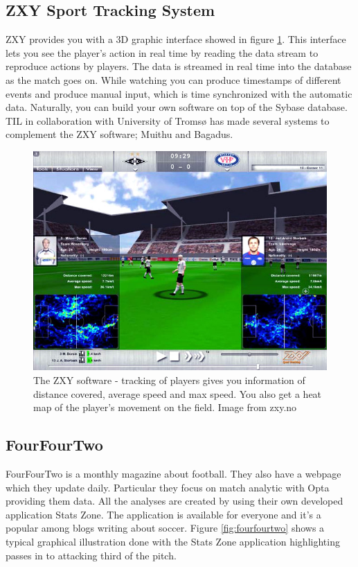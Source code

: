 \subsection{ZXY Sport Tracking System}
ZXY provides you with a 3D graphic interface showed in figure \ref{fig:zxysoftware}. This interface lets you see the player’s action in real time by reading the data stream to reproduce actions by players. The data is streamed in real time into the database as the match goes on. While watching you can produce timestamps of different events and produce manual input, which is time synchronized with the automatic data. Naturally, you can build your own software on top of the Sybase database. \ac{TIL} in collaboration with University of Troms{\o} has made several systems to complement the ZXY software; Muithu\cite{muithu} and Bagadus\cite{Saegrov2012}.

\begin{figure}[ht!]
\centering
\includegraphics[width=1\textwidth]{images/general/zxysoftware.png}
\caption{The ZXY software - tracking of players gives you information of distance covered, average speed and max speed. You also get a heat map of the player’s movement on the field. Image from zxy.no}
\label{fig:zxysoftware}
\end{figure}


\subsection{FourFourTwo}

FourFourTwo is a monthly magazine about football. They also have a webpage which they update daily. Particular they focus on match analytic with Opta providing them data. All the analyses are created by using their own developed application Stats Zone. The application is available for everyone and it’s a popular among blogs writing about soccer. Figure \ref{fig:fourfourtwo} shows a typical graphical illustration done with the Stats Zone application highlighting passes in to attacking third of the pitch. 

